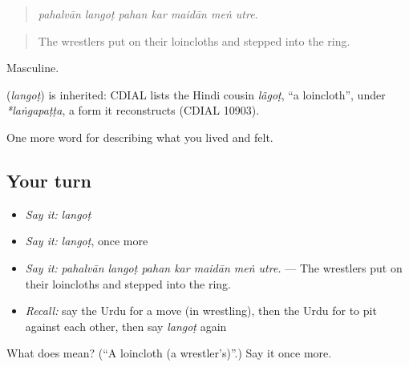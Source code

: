 \begin{quote}
\emph{pahalvān langoṭ pahan kar maidān meṅ utre.}
\end{quote}

\begin{quote}
The wrestlers put on their loincloths and stepped into the ring.
\end{quote}

Masculine.

\begin{cousinweb}
\textbf{} (\emph{langoṭ}) is inherited: CDIAL lists the Hindi cousin \emph{lãgoṭ}, \textquotedblleft{}a loincloth\textquotedblright{}, under \emph{*laṅgapaṭṭa}, a form it reconstructs (CDIAL 10903).
\end{cousinweb}

\begin{grammarlens}[title={What you've built}]
One more word for describing what you lived and felt.
\end{grammarlens}

\subsection*{Your turn}
\begin{itemize}
\raggedright
  \item \emph{Say it:} \emph{langoṭ}
  \item \emph{Say it:} \emph{langoṭ}, once more
  \item \emph{Say it:} \emph{pahalvān langoṭ pahan kar maidān meṅ utre.} — The wrestlers put on their loincloths and stepped into the ring.
  \item \emph{Recall:} say the Urdu for a move (in wrestling), then the Urdu for to pit against each other, then say \emph{langoṭ} again
\end{itemize}

\begin{tcolorbox}[breakable,colback=teal!4,colframe=teal!35!black,title={Before you move on}]
What does  mean? (\textquotedblleft{}A loincloth (a wrestler's)\textquotedblright{}.) Say it once more.
\end{tcolorbox}
